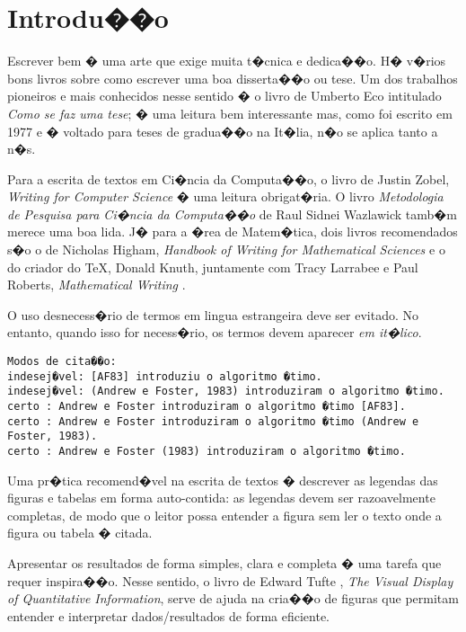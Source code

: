 \chapter{Introdu��o}
\label{cap:introducao}

Escrever bem � uma arte que exige muita t�cnica e dedica��o. H� v�rios bons livros
sobre como escrever uma boa disserta��o ou tese. Um dos trabalhos pioneiros e mais
conhecidos nesse sentido � o livro de Umberto Eco \cite{eco:09} intitulado 
\emph{Como se faz uma tese}; � uma leitura bem interessante mas, como foi escrito 
em 1977 e � voltado para teses de gradua��o na It�lia, n�o se aplica tanto a n�s.

Para a escrita de textos em Ci�ncia da Computa��o, o livro de Justin Zobel, 
\emph{Writing for Computer Science} \cite{zobel:04} � uma leitura obrigat�ria. 
O livro \emph{Metodologia de Pesquisa para Ci�ncia da Computa��o} de 
Raul Sidnei Wazlawick \cite{waz:09} tamb�m merece uma boa lida.
J� para a �rea de Matem�tica, dois livros recomendados s�o o de Nicholas Higham,
\emph{Handbook of Writing for Mathematical Sciences} \cite{Higham:98} e o do criador
do \TeX, Donald Knuth, juntamente com Tracy Larrabee e Paul Roberts, 
\emph{Mathematical Writing} \cite{Knuth:96}.

O uso desnecess�rio de termos em lingua estrangeira deve ser evitado. No entanto,
quando isso for necess�rio, os termos devem aparecer \emph{em it�lico}.

\begin{small}
\begin{verbatim}
Modos de cita��o:
indesej�vel: [AF83] introduziu o algoritmo �timo.
indesej�vel: (Andrew e Foster, 1983) introduziram o algoritmo �timo.
certo : Andrew e Foster introduziram o algoritmo �timo [AF83].
certo : Andrew e Foster introduziram o algoritmo �timo (Andrew e Foster, 1983).
certo : Andrew e Foster (1983) introduziram o algoritmo �timo.
\end{verbatim}
\end{small}

Uma pr�tica recomend�vel na escrita de textos � descrever as legendas das
figuras e tabelas em forma auto-contida: as legendas devem ser razoavelmente
completas, de modo que o leitor possa entender a figura sem ler o texto onde a
figura ou tabela � citada.  

Apresentar os resultados de forma simples, clara e completa � uma tarefa que
requer inspira��o. Nesse sentido, o livro de Edward Tufte \cite{tufte01:visualDisplay},
\emph{The Visual Display of Quantitative Information}, serve de ajuda na 
cria��o de figuras que permitam entender e interpretar dados/resultados de forma
eficiente.

